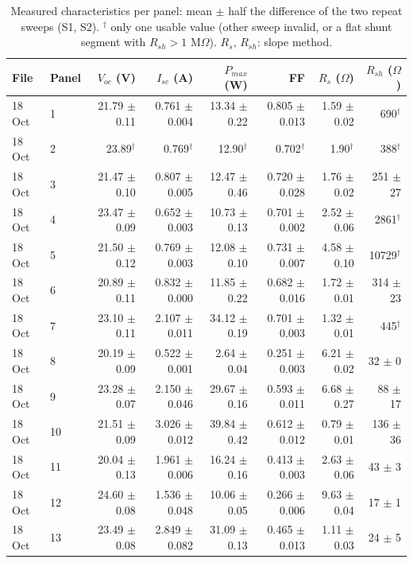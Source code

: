 \begin{table}
\caption{Measured characteristics per panel: mean $\pm$ half the difference of the two repeat sweeps (S1, S2). $^\dagger$ only one usable value (other sweep invalid, or a flat shunt segment with $R_{sh} > 1$ M$\Omega$). $R_s$, $R_{sh}$: slope method.}
\label{tab:panels}
\begin{tabular}{llrrrrrr}
\toprule
File & Panel & $V_{oc}$ (V) & $I_{sc}$ (A) & $P_{max}$ (W) & FF & $R_s$ ($\Omega$) & $R_{sh}$ ($\Omega$) \\
\midrule
18 Oct & 1 & 21.79 $\pm$ 0.11 & 0.761 $\pm$ 0.004 & 13.34 $\pm$ 0.22 & 0.805 $\pm$ 0.013 & 1.59 $\pm$ 0.02 & 690$^\dagger$ \\
18 Oct & 2 & 23.89$^\dagger$ & 0.769$^\dagger$ & 12.90$^\dagger$ & 0.702$^\dagger$ & 1.90$^\dagger$ & 388$^\dagger$ \\
18 Oct & 3 & 21.47 $\pm$ 0.10 & 0.807 $\pm$ 0.005 & 12.47 $\pm$ 0.46 & 0.720 $\pm$ 0.028 & 1.76 $\pm$ 0.02 & 251 $\pm$ 27 \\
18 Oct & 4 & 23.47 $\pm$ 0.09 & 0.652 $\pm$ 0.003 & 10.73 $\pm$ 0.13 & 0.701 $\pm$ 0.002 & 2.52 $\pm$ 0.06 & 2861$^\dagger$ \\
18 Oct & 5 & 21.50 $\pm$ 0.12 & 0.769 $\pm$ 0.003 & 12.08 $\pm$ 0.10 & 0.731 $\pm$ 0.007 & 4.58 $\pm$ 0.10 & 10729$^\dagger$ \\
18 Oct & 6 & 20.89 $\pm$ 0.11 & 0.832 $\pm$ 0.000 & 11.85 $\pm$ 0.22 & 0.682 $\pm$ 0.016 & 1.72 $\pm$ 0.01 & 314 $\pm$ 23 \\
18 Oct & 7 & 23.10 $\pm$ 0.11 & 2.107 $\pm$ 0.011 & 34.12 $\pm$ 0.19 & 0.701 $\pm$ 0.003 & 1.32 $\pm$ 0.01 & 445$^\dagger$ \\
18 Oct & 8 & 20.19 $\pm$ 0.09 & 0.522 $\pm$ 0.001 & 2.64 $\pm$ 0.04 & 0.251 $\pm$ 0.003 & 6.21 $\pm$ 0.02 & 32 $\pm$ 0 \\
18 Oct & 9 & 23.28 $\pm$ 0.07 & 2.150 $\pm$ 0.046 & 29.67 $\pm$ 0.16 & 0.593 $\pm$ 0.011 & 6.68 $\pm$ 0.27 & 88 $\pm$ 17 \\
18 Oct & 10 & 21.51 $\pm$ 0.09 & 3.026 $\pm$ 0.012 & 39.84 $\pm$ 0.42 & 0.612 $\pm$ 0.012 & 0.79 $\pm$ 0.01 & 136 $\pm$ 36 \\
18 Oct & 11 & 20.04 $\pm$ 0.13 & 1.961 $\pm$ 0.006 & 16.24 $\pm$ 0.16 & 0.413 $\pm$ 0.003 & 2.63 $\pm$ 0.06 & 43 $\pm$ 3 \\
18 Oct & 12 & 24.60 $\pm$ 0.08 & 1.536 $\pm$ 0.048 & 10.06 $\pm$ 0.05 & 0.266 $\pm$ 0.006 & 9.63 $\pm$ 0.04 & 17 $\pm$ 1 \\
18 Oct & 13 & 23.49 $\pm$ 0.08 & 2.849 $\pm$ 0.082 & 31.09 $\pm$ 0.13 & 0.465 $\pm$ 0.013 & 1.11 $\pm$ 0.03 & 24 $\pm$ 5 \\

\end{tabular}
\end{table}
